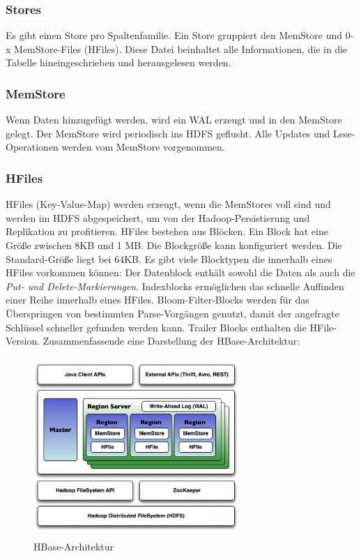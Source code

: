 \subsubsection{Stores}
Es gibt einen Store pro Spaltenfamilie. Ein Store gruppiert den MemStore und 0-x MemStore-Files (HFiles). Diese Datei beinhaltet alle Informationen, die in die Tabelle hineingeschrieben und herausgelesen werden.

\subsubsection{MemStore}\label{memstore}
Wenn Daten hinzugefügt werden, wird ein \ac{WAL} erzeugt und in den MemStore gelegt. Der MemStore wird periodisch ins HDFS geflusht. Alle Updates und Lese-Operationen werden vom MemStore vorgenommen.

\subsubsection{HFiles}
HFiles (Key-Value-Map) werden erzeugt, wenn die MemStores voll sind und werden im HDFS abgespeichert, um von der Hadoop-Persistierung und Replikation zu profitieren. HFiles bestehen aus Blöcken. Ein Block hat eine Größe zwischen 8KB und 1 MB. Die Blockgröße kann konfiguriert werden.  Die Standard-Größe liegt bei 64KB. Es gibt viele Blocktypen die innerhalb eines HFiles vorkommen können: Der Datenblock enthält sowohl die Daten als auch die \textit{Put- und Delete-Markierungen}. Indexblocks ermöglichen das schnelle Auffinden einer Reihe innerhalb eines HFiles. Bloom-Filter-Blocks werden für das Überspringen von  bestimmten Parse-Vorgängen genutzt, damit der angefragte Schlüssel schneller gefunden werden kann. Trailer Blocks enthalten die HFile-Version. 
Zusammenfassende eine Darstellung der HBase-Architektur:

\begin{figure}[htbp] 
  \centering
     \includegraphics[width=0.7\textwidth]{images/architecture.pdf}
  \caption{HBase-Architektur}
  \label{fig:HBase-Architektur}
\end{figure}



